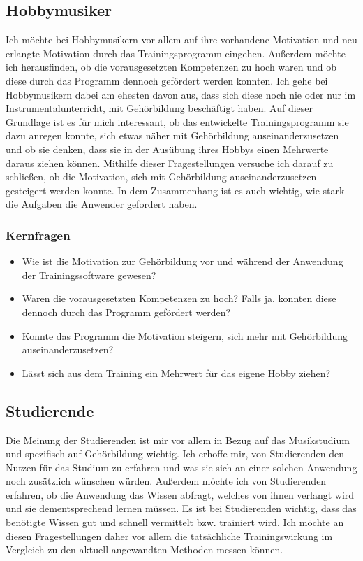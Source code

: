 \subsection{Hobbymusiker}
Ich möchte bei Hobbymusikern vor allem auf ihre vorhandene Motivation und neu erlangte Motivation durch das Trainingsprogramm eingehen. Außerdem möchte ich herausfinden, ob die vorausgesetzten Kompetenzen zu hoch waren und ob diese durch das Programm dennoch gefördert werden konnten. Ich gehe bei Hobbymusikern dabei am ehesten davon aus, dass sich diese noch nie oder nur im Instrumentalunterricht, mit Gehörbildung beschäftigt haben. Auf dieser Grundlage ist es für mich interessant, ob das entwickelte Trainingsprogramm sie dazu anregen konnte, sich etwas näher mit Gehörbildung auseinanderzusetzen und ob sie denken, dass sie in der Ausübung ihres Hobbys einen Mehrwerte daraus ziehen können. Mithilfe dieser Fragestellungen versuche ich darauf zu schließen, ob die Motivation, sich mit Gehörbildung auseinanderzusetzen gesteigert werden konnte. In dem Zusammenhang ist es auch wichtig, wie stark die Aufgaben die Anwender gefordert haben.
\subsubsection*{Kernfragen}
\begin{itemize}
    \item Wie ist die Motivation zur Gehörbildung vor und während der Anwendung der Trainingssoftware gewesen?
    \item Waren die vorausgesetzten Kompetenzen zu hoch? Falls ja, konnten diese dennoch durch das Programm gefördert werden?
    \item Konnte das Programm die Motivation steigern, sich mehr mit Gehörbildung auseinanderzusetzen?
    \item Lässt sich aus dem Training ein Mehrwert für das eigene Hobby ziehen?
\end{itemize}
 
\subsection{Studierende}
Die Meinung der Studierenden ist mir vor allem in Bezug auf das Musikstudium und spezifisch auf Gehörbildung wichtig. Ich erhoffe mir, von Studierenden den Nutzen für das Studium zu erfahren und was sie sich an einer solchen Anwendung noch zusätzlich wünschen würden. Außerdem möchte ich von Studierenden erfahren, ob die Anwendung das Wissen abfragt, welches von ihnen verlangt wird und sie dementsprechend lernen müssen. Es ist bei Studierenden wichtig, dass das benötigte Wissen gut und schnell vermittelt bzw. trainiert wird. Ich möchte an diesen Fragestellungen daher vor allem die tatsächliche Trainingswirkung im Vergleich zu den aktuell angewandten Methoden messen können.
